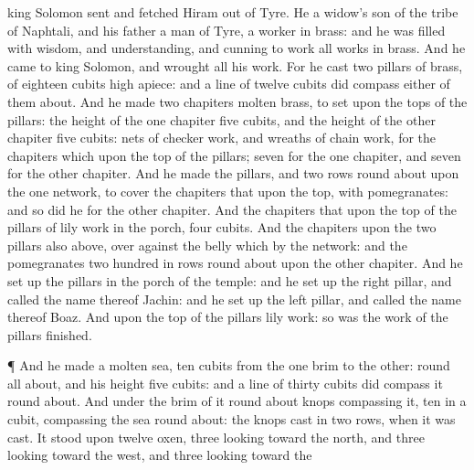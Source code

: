 {king
Solomon
sent and
fetched
Hiram out of
Tyre.
He
{} a
widow’s
son of the
tribe of
Naphtali, and his
father
{} a
man of
Tyre, a
worker in
brass: and he was
filled with
wisdom, and
understanding, and
cunning to
work all
works in
brass. And he
came to
king
Solomon, and
wrought all his
work.
For he
cast
two
pillars of
brass, of
eighteen
cubits
high
apiece: and a
line of
twelve
cubits did
compass
either of them
about.
And he
made
two
chapiters
{}
molten
brass, to
set upon the
tops of the
pillars: the
height of the
one
chapiter
{}
five
cubits, and the
height of the
other
chapiter
{}
five
cubits:
nets of
checker
work, and
wreaths of
chain
work, for the
chapiters which
{} upon the
top of the
pillars;
seven for the
one
chapiter, and
seven for the
other
chapiter.
And he
made the
pillars, and
two
rows round
about upon the
one
network, to
cover the
chapiters that
{} upon the
top, with
pomegranates: and so
did he for the
other
chapiter.
And the
chapiters that
{} upon the
top of the
pillars
{} of
lily
work in the
porch,
four
cubits.
And the
chapiters upon the
two
pillars
{} also
above, over
against the
belly which
{}
by the
network: and the
pomegranates
{} two
hundred in
rows round
about upon the
other
chapiter.
And he set
up the
pillars in the
porch of the
temple: and he set
up the
right
pillar, and
called the
name thereof
Jachin: and he set
up the
left
pillar, and
called the
name thereof
Boaz.
And upon the
top of the
pillars
{}
lily
work: so was the
work of the
pillars
finished.
\par }{\PP {}¶ And he
made a
molten
sea,
ten
cubits from the one
brim to the
other:
{}
round all
about, and his
height
{}
five
cubits: and a
line of
thirty
cubits did
compass it round
about.
And under the
brim of it round
about
{}
knops
compassing it,
ten in a
cubit,
compassing the
sea round
about: the
knops
{}
cast in
two
rows, when it was
cast.
It
stood upon
twelve
oxen,
three
looking toward the
north, and
three
looking toward the
west, and
three
looking toward the
}
